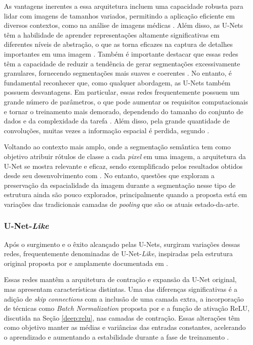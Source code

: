 As vantagens inerentes a essa arquitetura incluem uma capacidade robusta para lidar com imagens de tamanhos variados, permitindo a aplicação eficiente em diversos contextos, como na análise de imagens médicas \citep{Ronneberger2015U-net:Segmentation}. Além disso, as U-Nets têm a habilidade de aprender representações altamente significativas em diferentes níveis de abstração, o que as torna eficazes na captura de detalhes importantes em uma imagem \citep{Alom2019RecurrentSegmentation}. Também é importante destacar que essas redes têm a capacidade de reduzir a tendência de gerar segmentações excessivamente granulares, fornecendo segmentações mais suaves e coerentes \citep{Du2020MedicalReview}. No entanto, é fundamental reconhecer que, como qualquer abordagem, as U-Nets também possuem desvantagens. Em particular, essas redes frequentemente possuem um grande número de parâmetros, o que pode aumentar os requisitos computacionais e tornar o treinamento mais demorado, dependendo do tamanho do conjunto de dados e da complexidade da tarefa \citep{Ronneberger2015U-net:Segmentation}. Além disso, pela grande quantidade de convoluções, muitas vezes a informação espacial é perdida, segundo \cite{Zhang2023LcmUNet:Segmentation}.

Voltando ao contexto mais amplo, onde a segmentação semântica tem como objetivo atribuir rótulos de classe a cada \textit{pixel} em uma imagem, a arquitetura da U-Net se mostra relevante e eficaz, sendo exemplificado pelos resultados obtidos desde seu desenvolvimento com \cite{Ronneberger2015U-net:Segmentation}. No entanto, questões que exploram a preservação da espacialidade da imagem durante a segmentação nesse tipo de estrutura ainda são pouco explorados, principalmente quando a proposta está em variações das tradicionais camadas de \textit{pooling} que são os atuais estado-da-arte.

\subsubsection{U-Net-\textit{Like}}
\label{semantic:unetlike}
Após o surgimento e o êxito alcançado pelas U-Nets, surgiram variações dessas redes, frequentemente denominadas de U-Net-\textit{Like}, inspiradas pela estrutura original proposta por \cite{Ronneberger2015U-net:Segmentation} e amplamente documentada em \citep{Kugelman2022ASegmentation}.

Essas redes mantêm a arquitetura de contração e expansão da U-Net original, mas apresentam características distintas. Uma das diferenças significativas é a adição de \textit{skip connections} com a inclusão de uma camada extra, a incorporação de técnicas como \textit{Batch Normalization} proposta por \cite{Ioffe2015BatchShift} e a função de ativação ReLU, discutida na Seção \ref{deep:relu}, nas camadas de contração. Essas alterações têm como objetivo manter as médias e variâncias das entradas constantes, acelerando o aprendizado e aumentando a estabilidade durante a fase de treinamento \citep{Pfister2019AutomatedNetworks}.

